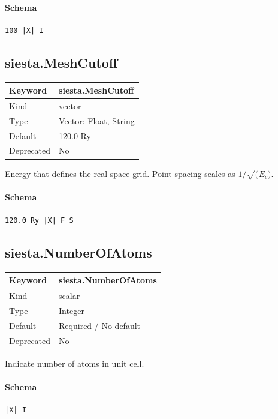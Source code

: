 \documentclass[11pt]{article}
\begin{document}
{{{{{\paragraph{Schema}
\begin{Verbatim}
100 |X| I
\end{Verbatim}

\subsection{siesta.MeshCutoff}
\label{kw:siesta-MeshCutoff}
\begin{longtable}{|p{1.5in}|p{4.5in}|}
\hline
Keyword & siesta.MeshCutoff \\
\hline
Kind & vector \\
\hline
Type & Vector: Float, String \\
\hline
Default & 120.0 Ry \\
\hline
Deprecated & No \\
\hline
\end{longtable}
 Energy that defines the real-space grid. Point spacing scales as $1/\sqrt(E_c)$.

\paragraph{Schema}
\begin{Verbatim}
120.0 Ry |X| F S
\end{Verbatim}

\subsection{siesta.NumberOfAtoms}
\label{kw:siesta-NumberOfAtoms}
\begin{longtable}{|p{1.5in}|p{4.5in}|}
\hline
Keyword & siesta.NumberOfAtoms \\
\hline
Kind & scalar \\
\hline
Type & Integer \\
\hline
Default & Required / No default \\
\hline
Deprecated & No \\
\hline
\end{longtable}
 Indicate number of atoms in unit cell.

\paragraph{Schema}
\begin{Verbatim}
|X| I
\end{Verbatim}

}}}}}
\end{document}
